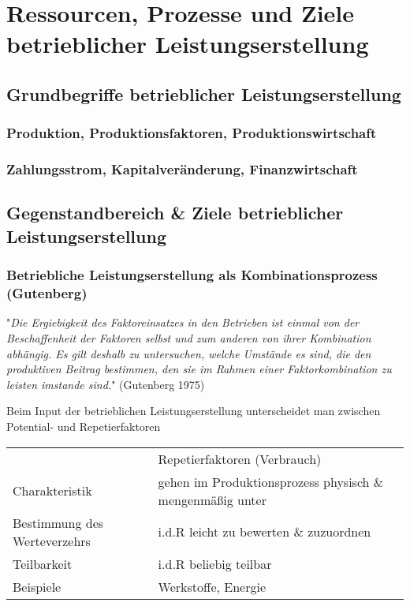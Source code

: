 \documentclass[11pt]{article}
\date{\today}
\title{}
\begin{document}
\tableofcontents

\section{Ressourcen, Prozesse und Ziele betrieblicher Leistungserstellung}
\label{sec:orgd13a2d5}
\subsection{Grundbegriffe betrieblicher Leistungserstellung}
\label{sec:org8dbf7df}
\subsubsection{Produktion, Produktionsfaktoren, Produktionswirtschaft}
\label{sec:orgde801cf}
\subsubsection{Zahlungsstrom, Kapitalveränderung, Finanzwirtschaft}
\label{sec:org5c792fa}
\subsection{Gegenstandbereich \& Ziele betrieblicher Leistungserstellung}
\label{sec:org531f673}
\subsubsection{Betriebliche Leistungserstellung als Kombinationsprozess (Gutenberg)}
\label{sec:org06cae84}
"\emph{Die Ergiebigkeit des Faktoreinsatzes in den  Betrieben ist einmal von der Beschaffenheit der Faktoren selbst und zum anderen von ihrer Kombination abhängig.
Es gilt deshalb zu untersuchen, welche Umstände es sind, die den produktiven Beitrag bestimmen, den sie im Rahmen einer Faktorkombination zu leisten imstande sind.}" (Gutenberg 1975)

Beim Input der betrieblichen Leistungserstellung unterscheidet man zwischen Potential- und Repetierfaktoren
\begin{center}
\begin{tabular}{ll}
 & Repetierfaktoren (Verbrauch)\\
Charakteristik & gehen im Produktionsprozess physisch \& mengenmäßig unter\\
Bestimmung des Werteverzehrs & i.d.R leicht zu bewerten \& zuzuordnen\\
Teilbarkeit & i.d.R beliebig teilbar\\
Beispiele & Werkstoffe, Energie\\
\end{tabular}
\end{center}
\end{document}
